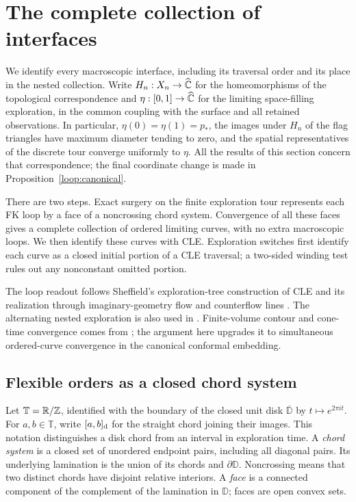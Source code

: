 \section{The complete collection of interfaces}\label{loop:section}

We identify every macroscopic interface, including its traversal order
and its place in the nested collection.  Write $H_n:X_n\to\widehat{\mathbb C}$
for the homeomorphisms of the
topological correspondence and $\eta:[0,1]\to\widehat{\mathbb C}$ for the limiting
space-filling exploration, in the common coupling with the surface and
all retained observations.  In particular, $\eta(0)=\eta(1)=p_*$,
the images under $H_n$ of the flag triangles have maximum diameter tending
to zero, and the spatial representatives of the discrete tour converge
uniformly to $\eta$.  All the results of this section concern that
correspondence; the final coordinate change is made in
Proposition~\ref{loop:canonical}.

There are two steps.  Exact surgery on the finite exploration tour
represents each FK loop by a face of a noncrossing chord system.
Convergence of all these faces gives a complete collection of ordered
limiting curves, with no extra macroscopic loops.  We then identify
these curves with CLE.  Exploration switches first identify each curve
as a closed initial portion of a CLE traversal; a two-sided winding
test rules out any nonconstant omitted portion.

The loop readout follows Sheffield's exploration-tree construction of
CLE \cite{SheffieldExplorationTrees} and its realization through
imaginary-geometry flow and counterflow lines \cite{MillerSheffieldIGIV}.
The alternating nested exploration is also used in
\cite[Section~2.1.6]{AruHoldenPowellSunCritical}. Finite-volume contour and
cone-time convergence comes from \citet{GwynneSunFKIII}; the argument
here upgrades it to simultaneous ordered-curve convergence in the
canonical conformal embedding.

\subsection{Flexible orders as a closed chord system}

Let $\mathbb T=\mathbb R/\mathbb Z$, identified with the boundary of the closed unit disk
$\overline{\mathbb D}$ by $t\mapsto e^{2\pi it}$.  For $a,b\in\mathbb T$,
write $[a,b]_{\rm d}$ for the straight chord joining their images.  This
notation distinguishes a disk chord from an interval in exploration time.
A \emph{chord system} is a closed set of unordered endpoint pairs, including
all diagonal pairs.  Its underlying lamination is the union of its chords
and $\partial\mathbb D$.  Noncrossing means that two distinct chords have
disjoint relative interiors.  A \emph{face} is a connected component of the
complement of the lamination in $\mathbb D$; faces are open convex sets.

